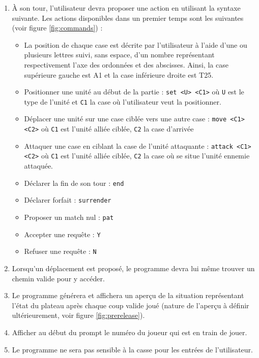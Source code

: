 \documentclass[a4paper]{report}
\begin{document}
\begin{enumerate}
\item À son tour, l'utilisateur devra proposer une action en utilisant la syntaxe suivante. Les actions disponibles dans un premier temps sont les suivantes (voir figure \ref{fig:commands}) :
	\begin{itemize}
    \item La position de chaque case est décrite par l'utilisateur à l'aide d'une ou plusieurs lettres suivi, sans espace, d'un nombre représentant respectivement l'axe des ordonnées et des abscisses. Ainsi, la case supérieure gauche est A1 et la case inférieure droite est T25.
    \item Positionner une unité au début de la partie : \texttt{set <U> <C1>} où \texttt{U} est le type de l'unité et \texttt{C1} la case où l'utilisateur veut la positionner.
	\item Déplacer une unité sur une case ciblée vers une autre case : \texttt{move <C1> <C2>} où \texttt{C1} est l'unité alliée ciblée, \texttt{C2} la case d'arrivée
    \item Attaquer une case en ciblant la case de l'unité attaquante : \texttt{attack <C1> <C2>} où \texttt{C1} est l'unité alliée ciblée, \texttt{C2} la case où se situe l'unité ennemie attaquée.
    \item Déclarer la fin de son tour : \texttt{end}
    \item Déclarer forfait : \texttt{surrender}
    \item Proposer un match nul : \texttt{pat}
    \item Accepter une requête : \texttt{Y}
    \item Refuser une requête : \texttt{N}
	\end{itemize}
    
\item Lorsqu'un déplacement est proposé, le programme devra lui même trouver un chemin valide pour y accéder.
\item Le programme générera et affichera un aperçu de la situation représentant l'état du plateau après chaque coup valide joué (nature de l'aperçu à définir ultérieurement, voir figure \ref{fig:prerelease}).

\item Afficher au début du prompt le numéro du joueur qui est en train de jouer.

\item Le programme ne sera pas sensible à la casse pour les entrées de l'utilisateur.


\end{enumerate}
% 
\end{document}
